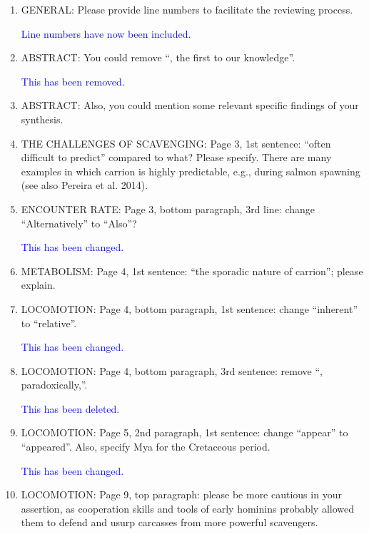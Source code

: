 \documentclass[12pt,letterpaper]{article}
\begin{document}
\begin{enumerate}

\item{GENERAL:} Please provide line numbers to facilitate the reviewing process.

\textcolor{blue}{Line numbers have now been included. }

\item{ABSTRACT:} You could remove ``, the first to our knowledge''.

\textcolor{blue}{This has been removed.}

\item{ABSTRACT:} Also, you could mention some relevant specific findings of your synthesis.

\item{THE CHALLENGES OF SCAVENGING:} Page 3, 1st sentence: ``often difficult to predict'' compared to what? Please specify. There are many examples in which carrion is highly predictable, e.g., during salmon spawning (see also Pereira et al. 2014).

\item{ENCOUNTER RATE:} Page 3, bottom paragraph, 3rd line: change ``Alternatively'' to ``Also''?

\textcolor{blue}{This has been changed.}

\item{METABOLISM:} Page 4, 1st sentence: ``the sporadic nature of carrion''; please explain.

\item{LOCOMOTION:} Page 4, bottom paragraph, 1st sentence: change ``inherent'' to ``relative''.

\textcolor{blue}{This has been changed.}

\item{LOCOMOTION:} Page 4, bottom paragraph, 3rd sentence: remove ``, paradoxically,''.

\textcolor{blue}{This has been deleted.}

\item{LOCOMOTION:} Page 5, 2nd paragraph, 1st sentence: change ``appear'' to ``appeared''. Also, specify Mya for the Cretaceous period.

\textcolor{blue}{This has been changed.}

\item{LOCOMOTION:} Page 9, top paragraph: please be more cautious in your assertion, as cooperation skills and tools of early hominins probably allowed them to defend and usurp carcasses from more powerful scavengers.


\end{enumerate}
\end{document}

